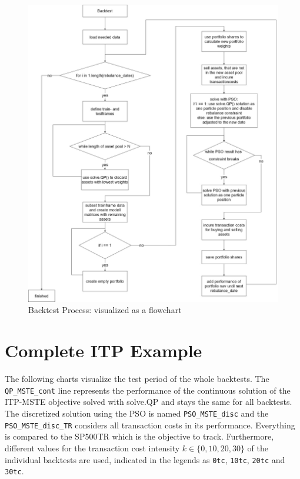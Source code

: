 \documentclass[
  oneside, a4paper, 12pt, openany]{book}
\theoremstyle{definition}
\theoremstyle{definition}
\theoremstyle{definition}
\theoremstyle{definition}
\theoremstyle{remark}
\begin{document}
\begin{figure}
\centering
\includegraphics{img/Chapter9_PSO_Process44.jpg}
\caption{Backtest Process: visualized as a flowchart}
\end{figure}

\pagebreak

\hypertarget{complete-itp-example}{%
\section{Complete ITP Example}\label{complete-itp-example}}

The following charts visualize the test period of the whole backtests. The \texttt{QP\_MSTE\_cont} line represents the performance of the continuous solution of the ITP-MSTE objective solved with solve.QP and stays the same for all backtests. The discretized solution using the PSO is named \texttt{PSO\_MSTE\_disc} and the \texttt{PSO\_MSTE\_disc\_TR} considers all transaction costs in its performance. Everything is compared to the SP500TR which is the objective to track. Furthermore, different values for the transaction cost intensity \(k \in \{0, 10, 20, 30\}\) of the individual backtests are used, indicated in the legends as \texttt{0tc}, \texttt{10tc}, \texttt{20tc} and \texttt{30tc}.
\end{document}
